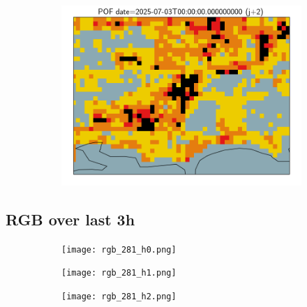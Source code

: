 \documentclass{article}
\begin{document}
\begin{figure}[H]
\begin{subfigure}[b]{0.31\textwidth}
    \end{subfigure}
    \begin{subfigure}[b]{0.36\textwidth}
        \centering
        \includegraphics[width=0.85\linewidth]{pof_281_j2.png} %
    \end{subfigure}
\end{figure}


\vspace{-1em}
\subsection*{RGB over last 3h}
\vspace{-1em}
\begin{figure}[H]
    \centering
    \begin{subfigure}[b]{0.32\textwidth}
        \centering
        \texttt{[image: rgb\_281\_h0.png]} %
    \end{subfigure}
    \begin{subfigure}[b]{0.32\textwidth}
        \centering
        \texttt{[image: rgb\_281\_h1.png]} %
    \end{subfigure}
    \begin{subfigure}[b]{0.32\textwidth}
        \centering
        \texttt{[image: rgb\_281\_h2.png]} %
    \end{subfigure}
\end{figure}
\end{document}
